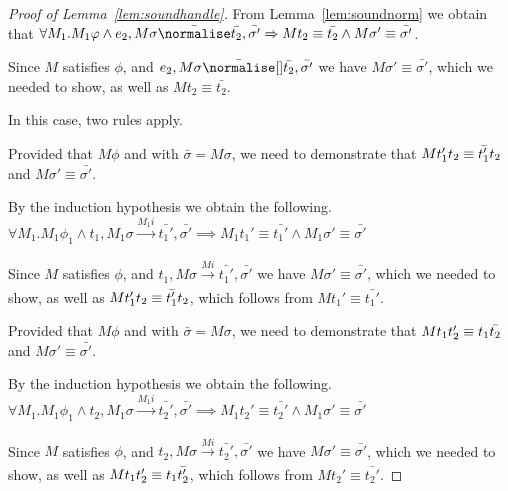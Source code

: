 \begin{proof}[Proof of Lemma~\ref{lem:soundhandle}]
{{    From Lemma~\ref{lem:soundnorm} we obtain that $\forall M_1. M_1 \phi \land e_2,M\sigma\bar{\normalise}\bar{t_2},\bar{\sigma'}\implies M t_2\equiv\bar{t_2}\land M \sigma'\equiv\bar{\sigma'}$.

    Since $M$ satisfies $\phi$, and $e_2,M\sigma \bar{\normalise}[] \bar{t_2},\bar{\sigma'}$ we have $M\sigma'\equiv\bar{\sigma'}$,
    which we needed to show, as well as $M t_2 \equiv \bar{t_2}$.
    }
  }

  {
  In this case, two rules apply.\\
    {Provided that $M\phi$ and  with $\bar{\sigma}=M\sigma$,
    we need to demonstrate that $M t_1'\relax t_2\equiv \bar{t_1'}\relax t_2$ and $M\sigma'\equiv \bar{\sigma'}$.

    By the induction hypothesis we obtain the following.\\
    $\forall M_1 . M_1 \phi_1 \land t_1,M_1\sigma \xrightarrow[]{M_1 i} \bar{t_1'},\bar{\sigma'}\implies M_1 t_1'\equiv\bar{t_1'}\land M_1\sigma' \equiv \bar{\sigma'}$

    Since $M$ satisfies $\phi$, and $t_1,M\sigma\xrightarrow[]{M i} \bar{t_1'},\bar{\sigma'}$ we have $M\sigma'\equiv\bar{\sigma'}$,
    which we needed to show, as well as $M t_1'\relax t_2\equiv \bar{t_1'}\relax t_2$, which follows from $M t_1' \equiv \bar{t_1'}$.

    }
    {Provided that $M\phi$ and  with $\bar{\sigma}=M\sigma$,
    we need to demonstrate that $M t_1\relax t_2'\equiv t_1\relax \bar{t_2}$ and $M\sigma'\equiv \bar{\sigma'}$.

    By the induction hypothesis we obtain the following.\\
    $\forall M_1 . M_1 \phi_1 \land t_2,M_1\sigma \xrightarrow[]{M_1 i} \bar{t_2'},\bar{\sigma'}\implies M_1 t_2'\equiv\bar{t_2'}\land M_1\sigma' \equiv \bar{\sigma'}$

    Since $M$ satisfies $\phi$, and $t_2,M\sigma\xrightarrow[]{M i} \bar{t_2'},\bar{\sigma'}$ we have $M\sigma'\equiv\bar{\sigma'}$,
    which we needed to show, as well as $M t_1\relax t_2'\equiv t_1\relax \bar{t_2'}$, which follows from $M t_2' \equiv \bar{t_2'}$.}
  }


\end{proof}
